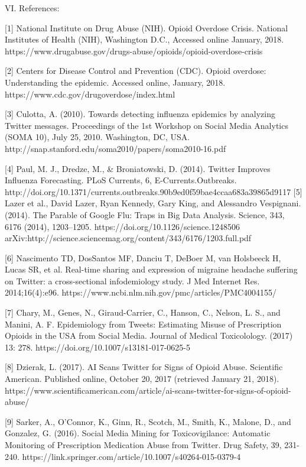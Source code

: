 VI. References:

[1] National Institute on Drug Abuse (NIH). Opioid Overdose Crisis. National Institutes of Health (NIH), Washington D.C., Accessed online January, 2018. https://www.drugabuse.gov/drugs-abuse/opioids/opioid-overdose-crisis 

[2] Centers for Disease Control and Prevention (CDC). Opioid overdose: Understanding the epidemic.
Accessed online, January, 2018. https://www.cdc.gov/drugoverdose/index.html 

[3] Culotta, A. (2010). Towards detecting influenza epidemics by analyzing Twitter messages. 
Proceedings of the 1st Workshop on Social Media Analytics (SOMA 10), July 25, 2010. Washington, DC, USA. http://snap.stanford.edu/soma2010/papers/soma2010-16.pdf 

[4] Paul, M. J., Dredze, M., & Broniatowski, D. (2014). Twitter Improves Influenza Forecasting. PLoS Currents, 6, E-Currents.Outbreaks. http://doi.org/10.1371/currents.outbreaks.90b9ed0f59bae4ccaa683a39865d9117 
[5] Lazer et al., David Lazer, Ryan Kennedy, Gary King, and Alessandro Vespignani. (2014). The Parable of Google Flu: Traps in Big Data Analysis. Science, 343, 6176 (2014), 1203–1205. https://doi.org/10.1126/science.1248506 arXiv:http://science.sciencemag.org/content/343/6176/1203.full.pdf 

[6] Nascimento TD, DosSantos MF, Danciu T, DeBoer M, van Holsbeeck H, Lucas SR, et al. Real-time sharing and expression of migraine headache suffering on Twitter: a cross-sectional infodemiology study. J Med Internet Res. 2014;16(4):e96. https://www.ncbi.nlm.nih.gov/pmc/articles/PMC4004155/ 

[7] Chary, M., Genes, N., Giraud-Carrier, C., Hanson, C., Nelson, L. S., and Manini, A. F. Epidemiology from Tweets: Estimating Misuse of Prescription Opioids in the USA from Social Media. Journal of Medical Toxicolology. (2017) 13: 278. https://doi.org/10.1007/s13181-017-0625-5 

[8] Dzierak, L. (2017). AI Scans Twitter for Signs of Opioid Abuse. Scientific American. Published online, October 20, 2017 (retrieved January 21, 2018). https://www.scientificamerican.com/article/ai-scans-twitter-for-signs-of-opioid-abuse/ 

[9] Sarker, A., O’Connor, K., Ginn, R., Scotch, M., Smith, K., Malone, D., and Gonzalez, G. (2016).
Social Media Mining for Toxicovigilance: Automatic Monitoring of Prescription Medication Abuse from Twitter. Drug Safety, 39, 231-240. https://link.springer.com/article/10.1007/s40264-015-0379-4

